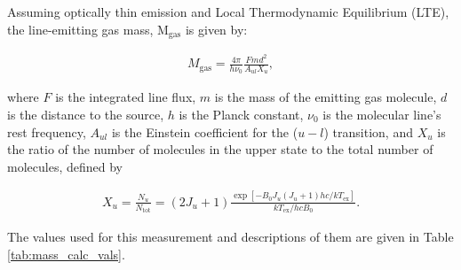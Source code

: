 Assuming optically thin emission and Local Thermodynamic Equilibrium (LTE), the line-emitting gas mass, M$_{\text{gas}}$ is given by:

\begin{align}
  M_{\text{gas}}= \frac{4 \pi}{h \nu_0} \frac{F m d^2}{A_{ul} X_u},
  \label{M_gas}
\end{align}

where $F$ is the integrated line flux, $m$ is the mass of the emitting gas molecule, $d$ is the distance to the source, $h$ is the Planck constant, $\nu_0$ is the molecular line's rest frequency, $A_{ul}$ is the Einstein coefficient for the ($u - l$) transition, and $X_u$ is the ratio of the number of molecules in the upper state to the total number of molecules, defined by

\begin{align}
  X_u = \frac{N_u}{N_{\text{tot}}} = (2 J_u + 1) \frac{\exp [-B_0 J_u (J_u + 1) h c/kT_{\text{ex}}]}{kT_{\text{ex}}/hc B_0}.
  \label{X_u}
\end{align}

The values used for this measurement and descriptions of them are given in Table \ref{tab:mass_calc_vals}. %



